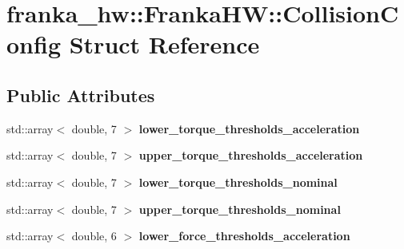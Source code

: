 \hypertarget{structfranka__hw_1_1_franka_h_w_1_1_collision_config}{}\section{franka\+\_\+hw\+:\+:Franka\+HW\+:\+:Collision\+Config Struct Reference}
\label{structfranka__hw_1_1_franka_h_w_1_1_collision_config}
\subsection*{Public Attributes}
\begin{DoxyCompactItemize}
\item 
\mbox{\label{structfranka__hw_1_1_franka_h_w_1_1_collision_config_a60ceadf11bcd44f72235c9fa34662a46}} 
std\+::array$<$ double, 7 $>$ {\bfseries lower\+\_\+torque\+\_\+thresholds\+\_\+acceleration}
\item 
\mbox{\label{structfranka__hw_1_1_franka_h_w_1_1_collision_config_a4934137b192b2c822ffe2ef812d26a6b}} 
std\+::array$<$ double, 7 $>$ {\bfseries upper\+\_\+torque\+\_\+thresholds\+\_\+acceleration}
\item 
\mbox{\label{structfranka__hw_1_1_franka_h_w_1_1_collision_config_a7acd8aaf8efab36ef3cde2ce650c9d72}} 
std\+::array$<$ double, 7 $>$ {\bfseries lower\+\_\+torque\+\_\+thresholds\+\_\+nominal}
\item 
\mbox{\label{structfranka__hw_1_1_franka_h_w_1_1_collision_config_a0597453d1212e5cd21db62ce16e74612}} 
std\+::array$<$ double, 7 $>$ {\bfseries upper\+\_\+torque\+\_\+thresholds\+\_\+nominal}
\item 
\mbox{\label{structfranka__hw_1_1_franka_h_w_1_1_collision_config_a9cf4577316a370d080ade0d1e6b73725}} 
std\+::array$<$ double, 6 $>$ {\bfseries lower\+\_\+force\+\_\+thresholds\+\_\+acceleration}
\item 
\mbox{\label{structfranka__hw_1_1_franka_h_w_1_1_collision_config_a0f47847f51dde3ad9788b444f8a4c5a6}} 

\end{DoxyCompactItemize}

